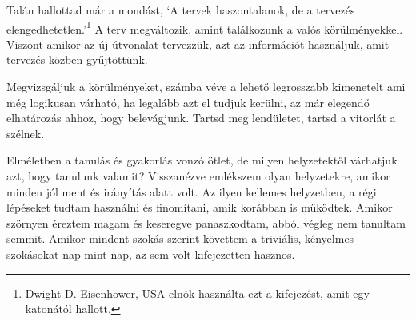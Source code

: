 
Talán hallottad már a mondást, `A tervek haszontalanok, de a tervezés
elengedhetetlen.'\footnote{Dwight D. Eisenhower, USA elnök használta ezt
  a kifejezést, amit egy katonától hallott.} A terv megváltozik, amint
találkozunk a valós körülményekkel. Viszont amikor az új útvonalat
tervezzük, azt az információt használjuk, amit tervezés közben
gyűjtöttünk.

Megvizsgáljuk a körülményeket, számba véve a lehető legrosszabb
kimenetelt ami még logikusan várható, ha legalább azt el tudjuk kerülni,
az már elegendő elhatározás ahhoz, hogy belevágjunk. Tartsd meg
lendületet, tartsd a vitorlát a szélnek.

Elméletben a tanulás és gyakorlás vonzó ötlet, de milyen helyzetektől
várhatjuk azt, hogy tanulunk valamit? Visszanézve emlékszem olyan
helyzetekre, amikor minden jól ment és irányítás alatt volt. Az ilyen
kellemes helyzetben, a régi lépéseket tudtam használni és finomítani,
amik korábban is működtek. Amikor szörnyen éreztem magam és keseregve
panaszkodtam, abból végleg nem tanultam semmit. Amikor mindent szokás
szerint követtem a triviális, kényelmes szokásokat nap mint nap, az sem
volt kifejezetten hasznos.

\clearpage
\null\vfill

